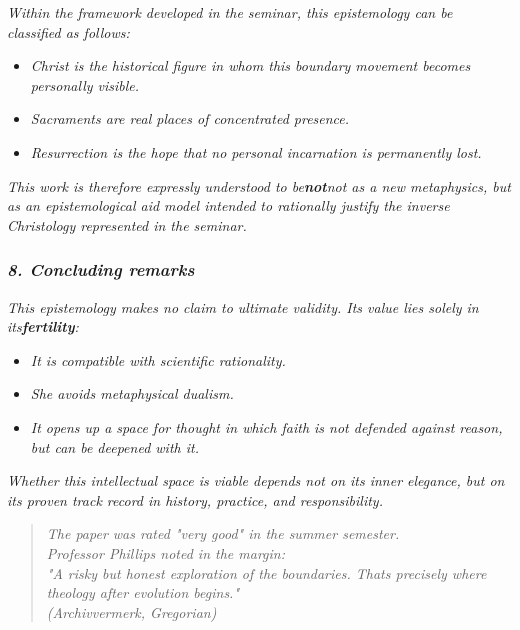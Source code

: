 \documentclass[
]{article}
\begin{document}
\emph{Within the framework developed in the seminar, this epistemology can be classified as follows:}

\begin{itemize}
\item
  \emph{Christ is the historical figure in whom this boundary movement becomes personally visible.}
\item
  \emph{Sacraments are real places of concentrated presence.}
\item
  \emph{Resurrection is the hope that no personal incarnation is permanently lost.}
\end{itemize}

\emph{This work is therefore expressly understood to be\textbf{not}not as a new metaphysics, but as an epistemological aid model intended to rationally justify the inverse Christology represented in the seminar.}

\subsubsection{\texorpdfstring{\emph{\textbf{8. Concluding remarks}}}{8. Concluding remarks}}\label{concluding-remarks}

\emph{This epistemology makes no claim to ultimate validity. Its value lies solely in its\textbf{fertility}:}

\begin{itemize}
\item
  \emph{It is compatible with scientific rationality.}
\item
  \emph{She avoids metaphysical dualism.}
\item
  \emph{It opens up a space for thought in which faith is not defended against reason, but can be deepened with it.}
\end{itemize}

\emph{Whether this intellectual space is viable depends not on its inner elegance, but on its proven track record in history, practice, and responsibility.}

\begin{quote}
\emph{The paper was rated "very good" in the summer semester.\\
Professor Phillips noted in the margin:\\
"A risky but honest exploration of the boundaries. That\textquotesingle s precisely where theology after evolution begins."\\
(Archivvermerk, Gregorian)}
\end{quote}
\end{document}
